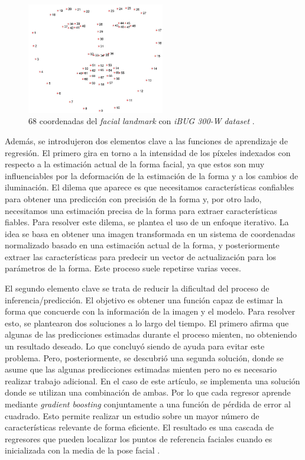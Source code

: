 \begin{figure}[htp]
	\centering
	\includegraphics[width=6cm]{imagenes/facial_landmarks_68markup.jpg}
	\caption[68 coordenadas del \textit{facial landmark} con \textit{iBUG 300-W} \textit{dataset}]{68 coordenadas del \textit{facial landmark} con \textit{iBUG 300-W} \textit{dataset} \cite{ibug}.}
	\label{fig:dlibPoints}
\end{figure}

Además, se introdujeron dos elementos clave a las funciones de aprendizaje de regresión. El primero gira en torno a la intensidad de los píxeles indexados con respecto a la estimación actual de la forma facial, ya que estos son muy influenciables por la deformación de la estimación de la forma y a los cambios de iluminación. El dilema que aparece es que necesitamos características confiables para obtener una predicción con precisión de la forma y, por otro lado, necesitamos una estimación precisa de la forma para extraer características fiables. Para resolver este dilema, se plantea el uso de un enfoque iterativo. La idea se basa en obtener una imagen transformada en un sistema de coordenadas normalizado basado en una estimación actual de la forma, y posteriormente extraer las características para predecir un vector de actualización para los parámetros de la forma. Este proceso suele repetirse varias veces.

El segundo elemento clave se trata de reducir la dificultad del proceso de inferencia/predicción. El objetivo es obtener una función capaz de estimar la forma que concuerde con la información de la imagen y el modelo. 
Para resolver esto, se plantearon dos soluciones a lo largo del tiempo. El primero afirma que algunas de las predicciones estimadas durante el proceso mienten, no obteniendo un resultado deseado. Lo que concluyó siendo de ayuda para evitar este problema. Pero, posteriormente, se descubrió una segunda solución, donde se asume que las algunas predicciones estimadas mienten pero no es necesario realizar trabajo adicional. En el caso de este artículo, se implementa una solución donde se utilizan una combinación de ambas. Por lo que cada regresor aprende mediante \textit{gradient boosting} conjuntamente a una función de pérdida de error al cuadrado.
Esto permite realizar un estudio sobre un mayor número de características relevante de forma eficiente. El resultado es una cascada de regresores que pueden localizar los puntos de referencia faciales cuando es inicializada con la media de la pose facial \cite{faceLandmark}.

